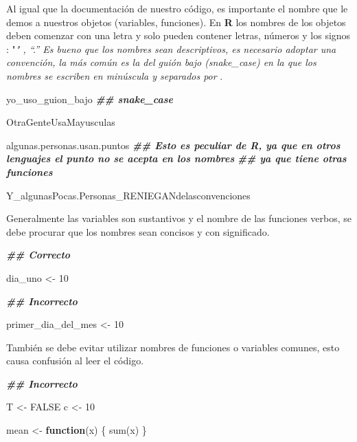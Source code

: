 \documentclass[
  12pt,
]{book}
\newenvironment{Shaded}{\begin{snugshade}}{\end{snugshade}}
\newcommand{\ConstantTok}[1]{\textcolor[rgb]{0.00,0.00,0.00}{#1}}
\newcommand{\ControlFlowTok}[1]{\textcolor[rgb]{0.13,0.29,0.53}{\textbf{#1}}}
\newcommand{\DecValTok}[1]{\textcolor[rgb]{0.00,0.00,0.81}{#1}}
\newcommand{\DocumentationTok}[1]{\textcolor[rgb]{0.56,0.35,0.01}{\textbf{\textit{#1}}}}
\newcommand{\FunctionTok}[1]{\textcolor[rgb]{0.00,0.00,0.00}{#1}}
\newcommand{\NormalTok}[1]{#1}
\newcommand{\OtherTok}[1]{\textcolor[rgb]{0.56,0.35,0.01}{#1}}
\begin{document}
Al igual que la documentación de nuestro código, es importante el nombre que le demos a nuestros objetos (variables, funciones). En \textbf{R} los nombres de los objetos deben comenzar con una letra y solo pueden contener letras, números y los signos : "\emph{" , ``.'' Es bueno que los nombres sean descriptivos, es necesario adoptar una convención, la más común es la del guión bajo (snake\_case) en la que los nombres se escriben en minúscula y separados por } .

\begin{Shaded}
\begin{Highlighting}[]
\NormalTok{yo\_uso\_guion\_bajo  }\DocumentationTok{\#\# snake\_case}

\NormalTok{OtraGenteUsaMayusculas}

\NormalTok{algunas.personas.usan.puntos }\DocumentationTok{\#\# Esto es peculiar de R, ya que en otros lenguajes el punto no se acepta en los nombres}
\DocumentationTok{\#\# ya que tiene otras funciones}

\NormalTok{Y\_algunasPocas.Personas\_RENIEGANdelasconvenciones}
\end{Highlighting}
\end{Shaded}

Generalmente las variables son sustantivos y el nombre de las funciones verbos, se debe procurar que los nombres sean concisos y con significado.

\begin{Shaded}
\begin{Highlighting}[]
\DocumentationTok{\#\# Correcto}

\NormalTok{dia\_uno }\OtherTok{\textless{}{-}} \DecValTok{10}

\DocumentationTok{\#\# Incorrecto}

\NormalTok{primer\_dia\_del\_mes }\OtherTok{\textless{}{-}} \DecValTok{10}
\end{Highlighting}
\end{Shaded}

También se debe evitar utilizar nombres de funciones o variables comunes, esto causa confusión al leer el código.

\begin{Shaded}
\begin{Highlighting}[]
\DocumentationTok{\#\# Incorrecto}

\NormalTok{T }\OtherTok{\textless{}{-}} \ConstantTok{FALSE}
\NormalTok{c }\OtherTok{\textless{}{-}} \DecValTok{10}

\NormalTok{mean }\OtherTok{\textless{}{-}} \ControlFlowTok{function}\NormalTok{(x) \{}
  \FunctionTok{sum}\NormalTok{(x)}
\NormalTok{\}}
\end{Highlighting}
\end{Shaded}
\end{document}
